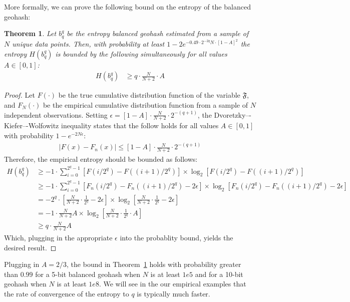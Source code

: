 \documentclass{article} %
\newtheorem{thm}{Theorem}
\begin{document}
More formally, we can prove the following bound on the entropy of the balanced geohash:
\begin{thm} \label{entropyThm}
Let $b_q^q$ be the entropy balanced geohash estimated from a sample of $N$ unique data points. Then,
with probability at least $1 - 2 e^{-0.49 \cdot 2^{-2q} N \cdot [1 - A]^2}$ the entropy
$H(b_q^q)$ is bounded by the following simultaneously for all values $A \in [0,1]$:
\begin{align}
H(b_q^q) &\geq q \cdot \frac{N}{N+2} \cdot A
\end{align}
\end{thm}
\begin{proof}
Let $F(\cdot)$ be the true cumulative distribution function of the variable $\mathfrak{F}$,
and $F_N(\cdot)$ be the empirical cumulative distribution function from a sample of $N$
independent observations. Setting $\epsilon = [1 - A] \cdot \frac{N}{N+2} \cdot 2^{-(q+1)}$,
the Dvoretzky–-Kiefer–-Wolfowitz inequality states that the follow holds for all values
$A \in [0,1]$ with probability $1 - e^{-2N\epsilon}$:
\begin{align}
|F(x) - F_n(x)| \leq [1 - A] \cdot \frac{N}{N+2} \cdot 2^{-(q+1)}
\end{align}
Therefore, the empirical entropy should be bounded as follows:
\begin{align}
H(b_q^q) &\geq -1 \cdot \sum_{i=0}^{2^q-1} \left[F(i/2^q) - F((i+1)/2^q)\right] \times
  \log_2 \left[F(i/2^q) - F((i+1)/2^q)\right] \\
&\geq -1 \cdot \sum_{i=0}^{2^q-1} \left[F_n(i/2^q) - F_n((i+1)/2^q) - 2\epsilon \right] \times
  \log_2 \left[F_n(i/2^q) - F_n((i+1)/2^q) - 2\epsilon \right] \\
&= -2^{q} \cdot \left[\frac{N}{N+2} \cdot \frac{1}{2^q} - 2 \epsilon \right] \times
  \log_2 \left[\frac{N}{N+2} \cdot \frac{1}{2^q} - 2 \epsilon  \right] \\
&= -1 \cdot \frac{N}{N+2} A \times \log_2 \left[\frac{N}{N+2} \cdot \frac{1}{2^q} \cdot A  \right] \\
&\geq q \cdot \frac{N}{N+2} A
\end{align}
Which, plugging in the appropriate $\epsilon$ into the probablity bound, yields the desired result.
\end{proof}
Plugging in $A=2/3$, the bound in Theorem~\ref{entropyThm} holds with probability greater than $0.99$
for a 5-bit balanced geohash when $N$ is at least $1e5$ and for a 10-bit geohash when $N$ is at
least $1e8$. We will see in the our empirical examples that the rate of convergence of the entropy
to $q$ is typically much faster.
\end{document}
